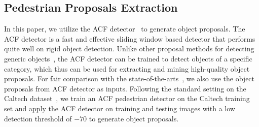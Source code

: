 \documentclass[journal]{IEEEtran}
\begin{document}
\subsection{Pedestrian Proposals Extraction}
In this paper, we utilize the ACF detector~\cite{dollar2014fast} to generate object proposals. The ACF detector is a fast and effective sliding window based detector that performs quite well on rigid object detection. Unlike other proposal methods for detecting generic objects~\cite{uijlings2013selective,arbelaez2014multiscale,zitnick2014edge}, the ACF detector can be trained to detect objects of a specific category, which thus can be used for extracting and mining high-quality object proposals. For fair comparison with the state-of-the-arts~\cite{hosang2015taking,ta_cnn}, we also use the object proposals from ACF detector as inputs. Following the standard setting on the Caltech dataset~\cite{dollar2012pedestrian}, we train an ACF pedestrian detector on the Caltech training set and apply the ACF detector on training and testing images with a low detection threshold of $-70$ to generate object proposals.
\end{document}
